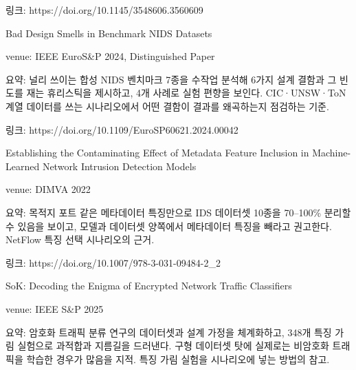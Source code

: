 \par\noindent \textbullet\enspace 링크: https:/\allowbreak{}/\allowbreak{}doi.org/\allowbreak{}10.1145/\allowbreak{}3548606.3560609



\par\noindent \textbullet\enspace Bad Design Smells in Benchmark NIDS Datasets

\par\noindent \textbullet\enspace venue: IEEE EuroS\&P 2024, Distinguished Paper


\par\noindent \textbullet\enspace 요약: 널리 쓰이는 합성 NIDS 벤치마크 7종을 수작업 분석해 6가지 설계 결함과 그 빈도를 재는 휴리스틱을 제시하고, 4개 사례로 실험 편향을 보인다. CIC·UNSW·ToN 계열 데이터를 쓰는 시나리오에서 어떤 결함이 결과를 왜곡하는지 점검하는 기준.


\par\noindent \textbullet\enspace 링크: https:/\allowbreak{}/\allowbreak{}doi.org/\allowbreak{}10.1109/\allowbreak{}EuroSP60621.2024.00042



\par\noindent \textbullet\enspace Establishing the Contaminating Effect of Metadata Feature Inclusion in Machine-Learned Network Intrusion Detection Models

\par\noindent \textbullet\enspace venue: DIMVA 2022


\par\noindent \textbullet\enspace 요약: 목적지 포트 같은 메타데이터 특징만으로 IDS 데이터셋 10종을 70–100\% 분리할 수 있음을 보이고, 모델과 데이터셋 양쪽에서 메타데이터 특징을 빼라고 권고한다. NetFlow 특징 선택 시나리오의 근거.


\par\noindent \textbullet\enspace 링크: https:/\allowbreak{}/\allowbreak{}doi.org/\allowbreak{}10.1007/\allowbreak{}978-3-031-09484-2\_\allowbreak{}2



\par\noindent \textbullet\enspace SoK: Decoding the Enigma of Encrypted Network Traffic Classifiers

\par\noindent \textbullet\enspace venue: IEEE S\&P 2025


\par\noindent \textbullet\enspace 요약: 암호화 트래픽 분류 연구의 데이터셋과 설계 가정을 체계화하고, 348개 특징 가림 실험으로 과적합과 지름길을 드러낸다. 구형 데이터셋 탓에 실제로는 비암호화 트래픽을 학습한 경우가 많음을 지적. 특징 가림 실험을 시나리오에 넣는 방법의 참고.


